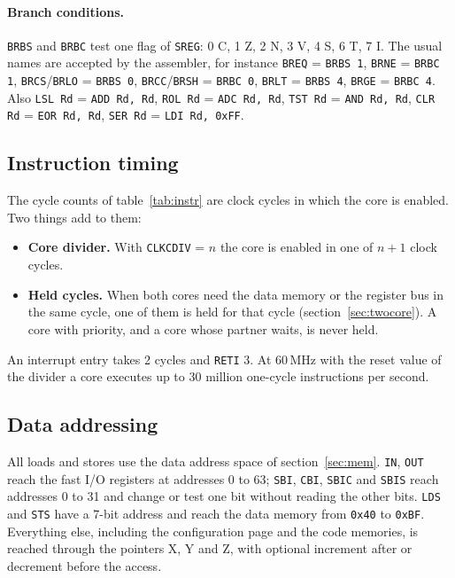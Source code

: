 \documentclass[10pt,a4paper]{article}
\newcommand{\reg}[1]{\texttt{#1}}
\begin{document}
\paragraph{Branch conditions.} \texttt{BRBS} and \texttt{BRBC} test one flag of \reg{SREG}: 0 C, 1 Z, 2 N, 3 V, 4 S, 6 T,
7 I. The usual names are accepted by the assembler, for instance \texttt{BREQ} = \texttt{BRBS 1}, \texttt{BRNE} =
\texttt{BRBC 1}, \texttt{BRCS}/\texttt{BRLO} = \texttt{BRBS 0}, \texttt{BRCC}/\texttt{BRSH} = \texttt{BRBC 0}, \texttt{BRLT} =
\texttt{BRBS 4}, \texttt{BRGE} = \texttt{BRBC 4}. Also \texttt{LSL Rd} = \texttt{ADD Rd, Rd}, \texttt{ROL Rd} =
\texttt{ADC Rd, Rd}, \texttt{TST Rd} = \texttt{AND Rd, Rd}, \texttt{CLR Rd} = \texttt{EOR Rd, Rd}, \texttt{SER Rd} =
\texttt{LDI Rd, 0xFF}.

\subsection{Instruction timing}

The cycle counts of table~\ref{tab:instr} are clock cycles in which the core is enabled. Two things add to them:

\begin{itemize}
\item \textbf{Core divider.} With \reg{CLKCDIV} = $n$ the core is enabled in one of $n+1$ clock cycles.
\item \textbf{Held cycles.} When both cores need the data memory or the register bus in the same cycle, one of them
is held for that cycle (section~\ref{sec:twocore}). A core with priority, and a core whose partner waits, is
never held.
\end{itemize}

An interrupt entry takes 2 cycles and \texttt{RETI} 3. At 60\,MHz with the reset value of the divider a core executes up to 30 million
one-cycle instructions per second.

\subsection{Data addressing}

All loads and stores use the data address space of section~\ref{sec:mem}. \texttt{IN}, \texttt{OUT} reach the fast
I/O registers at addresses 0 to 63; \texttt{SBI}, \texttt{CBI}, \texttt{SBIC} and \texttt{SBIS} reach addresses 0 to 31 and
change or test one bit without reading the other bits. \texttt{LDS} and \texttt{STS} have a 7-bit address and reach
the data memory from \texttt{0x40} to \texttt{0xBF}. Everything else, including the configuration page and the code
memories, is reached through the pointers X, Y and Z, with optional increment after or decrement before the
access.
\end{document}
